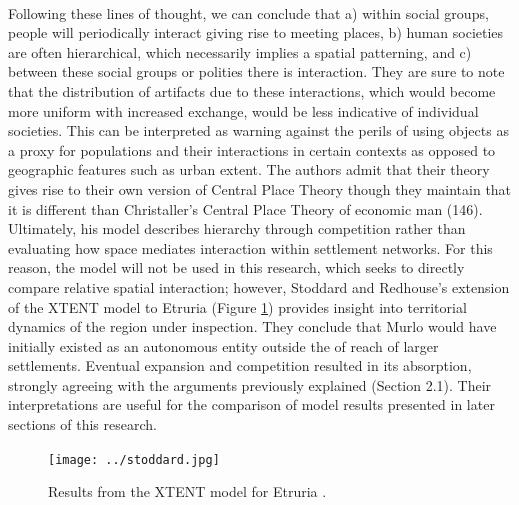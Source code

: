 \documentclass[12pt,a4paper]{thesis}
\begin{document}
\paragraph{}
Following these lines of thought, we can conclude that a) within social groups, people will periodically interact giving rise to meeting places, b) human societies are often hierarchical, which necessarily implies a spatial patterning, and c) between these social groups or polities there is interaction. They are sure to note that the distribution of artifacts due to these interactions, which would become more uniform with increased  exchange, would be less indicative of individual societies. This can be interpreted as warning against the perils of using objects as a proxy for populations and their interactions in certain contexts as opposed to geographic features such as urban extent. The authors admit that their theory gives rise to their own version of Central Place Theory though they maintain that it is different than Christaller's Central Place Theory of economic man (146). Ultimately, his model describes hierarchy through competition rather than evaluating how space mediates interaction within settlement networks. For this reason, the model will not be used in this research, which seeks to directly compare relative spatial interaction; however, Stoddard and Redhouse's \citeyearpar{StoRed11} extension of the XTENT model to Etruria (Figure \ref{fig:stoddard}) provides insight into territorial dynamics of the region under inspection. They conclude that Murlo would have initially existed as an autonomous entity outside the of reach of larger settlements. Eventual expansion and competition resulted in its absorption, strongly agreeing with the arguments previously explained (Section 2.1). Their interpretations are useful for the comparison of model results presented in later sections of this research. 

\begin{figure}
\centering
\texttt{[image: ../stoddard.jpg]}
\caption[Results from the XTENT model for Etruria]{Results from the XTENT model for Etruria \citep{StoRed11}.}
\label{fig:stoddard}
\end{figure}
\end{document}
